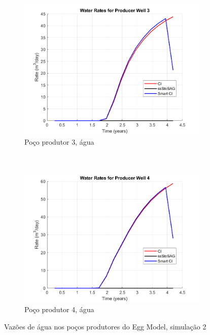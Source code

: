 \begin{figure}[!ht]
	\begin{subfigure}[b]{.45\textwidth}
		\includegraphics[width=\textwidth]{figs/resultadosEgg/imgsim2/EGG_WaterWell3_Zoom}
		\caption{Po\c{c}o produtor 3, \'{a}gua}
		\label{EGG2_WaterWell3}
	\end{subfigure}
	~
	\begin{subfigure}[b]{.45\textwidth}
		\includegraphics[width=\textwidth]{figs/resultadosEgg/imgsim2/EGG_WaterWell4_Zoom}
		\caption{Po\c{c}o produtor 4, \'{a}gua}
		\label{EGG2_WaterWell4}
	\end{subfigure}
	\caption{Vaz\~{o}es de \'{a}gua nos po\c{c}os produtores do Egg Model, simula\c{c}\~{a}o 2}
	\label{EGG2_WaterRates}
\end{figure}

